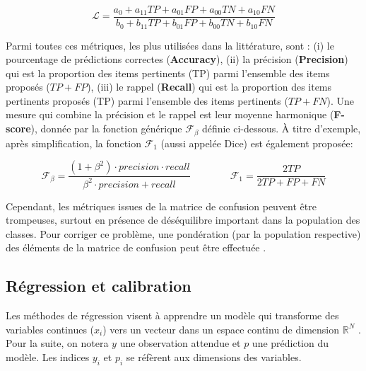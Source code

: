 \documentclass[../thesis.tex]{subfiles}
\begin{document}
    \vfill
    \begin{equation}
    \mathcal{L} = \frac{a_0 + a_{11} TP + a_{01}FP + a_{00}TN + a_{10}FN} {b_0 + b_{11} TP + b_{01}FP + b_{00}TN + b_{10}FN}
    \label{eqn:03-classification-metrics}
    \end{equation}
    \vfill
    
    Parmi toutes ces métriques, les plus utilisées dans la littérature, sont : (i) le pourcentage de prédictions correctes (\textbf{Accuracy}), (ii) la précision (\textbf{Precision}) qui est la proportion des items pertinents (TP) parmi l'ensemble des items proposés ($TP+FP$), (iii) le rappel (\textbf{Recall}) qui est la proportion des items pertinents proposés (TP) parmi l'ensemble des items pertinents ($TP+FN$). Une mesure qui combine la précision et le rappel est leur moyenne harmonique (\textbf{F-score}), donnée par la fonction générique $\mathcal{F}_\beta$ définie ci-dessous. À titre d'exemple, après simplification, la fonction $\mathcal{F}_1$ (aussi appelée Dice) est également proposée:
    
    \vfill
    \begin{equation}
    \mathcal{F}_\beta = \frac{(1+\beta^2) \cdot precision \cdot recall}{\beta^2 \cdot precision + recall}
    \hspace{4em}
    \mathcal{F}_1 = \frac{2TP}{2TP+FP+FN}
    \label{eqn:03-f_beta}
    \end{equation}
    \vfill
    
    
    Cependant, les métriques issues de la matrice de confusion peuvent être trompeuses, surtout en présence de déséquilibre important dans la population des classes. Pour corriger ce problème, une pondération (par la population respective) des éléments de la matrice de confusion peut être effectuée \cite{tripicchio2020welding}.
    
    \newpage
    \subsection{Régression et calibration}
    
    Les méthodes de régression visent à apprendre un modèle qui transforme des variables continues ($x_i$) vers un vecteur dans un espace continu de dimension $\mathbb{R}^N$ \cite{di2008review}. %
    Pour la suite, on notera $y$ une observation attendue et $p$ une prédiction du modèle. Les indices $y_i$ et $p_i$ se réfèrent aux dimensions des variables.
    
\end{document}

